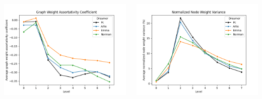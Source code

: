 \begin{minipage}[t]{\textwidth}
\begin{columns}
    \begin{column}{0.45\textwidth}
        \includegraphics[width=\textwidth]{immagini/Ph1_GWAC}
    \end{column}
    \begin{column}{0.45\textwidth}
        \includegraphics[width=\textwidth]{immagini/Ph1_NNWv}
    \end{column}
    \end{columns}
\end{minipage}